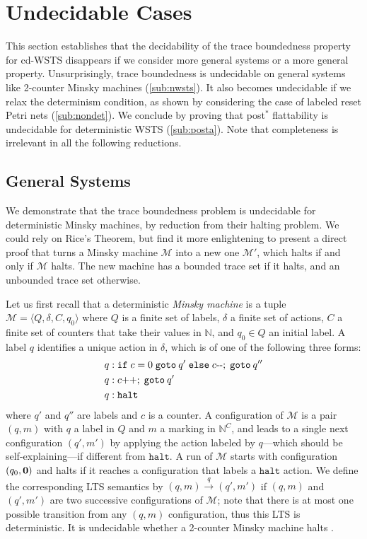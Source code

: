 \documentclass[11pt,reqno,a4paper]{amsart}
\def\vec#1{\mathchoice{\mbox{\boldmath$\displaystyle#1$}}
{\mbox{\boldmath$\textstyle#1$}}
{\mbox{\boldmath$\scriptstyle#1$}}
{\mbox{\boldmath$\scriptscriptstyle#1$}}}
\newcommand{\tup}[1]{\langle #1\rangle}
\newcommand{\ru}[1]{\xrightarrow{#1}}
\theoremstyle{plain}
\theoremstyle{definition}
\theoremstyle{remark}
\begin{document}
\section{Undecidable Cases}\label{sec:undec}
This section establishes that the decidability of the trace
boundedness property for cd-WSTS disappears if we consider more
general systems or a more general property.  Unsurprisingly, trace
boundedness is undecidable on general systems like 2-counter Minsky
machines (\autoref{sub:nwsts}).  It also becomes undecidable if we
relax the determinism condition, as shown by considering the case of
labeled reset Petri nets (\autoref{sub:nondet}).  We conclude by
proving that post$^\ast$ flattability is undecidable for deterministic
WSTS (\autoref{sub:posta}).  Note that completeness is irrelevant in
all the following reductions.

\subsection{General Systems}\label{sub:nwsts}
We demonstrate that the trace boundedness problem is
undecidable for deterministic Minsky machines, by reduction
from their halting problem.  We could rely on Rice's Theorem, but find
it more enlightening to present a direct proof that turns a Minsky
machine $\mathcal{M}$ into a new one $\mathcal{M}'$, which halts if
and only if $\mathcal{M}$ halts.  The new machine has a bounded trace
set if it halts, and an unbounded trace set otherwise.

Let us first recall that a deterministic \emph{Minsky machine} is a
tuple $\mathcal{M}=\tup{Q,\delta,C,q_0}$ where $Q$ is a finite set of
labels, $\delta$ a finite set of actions, $C$ a
finite set of counters that take their values in $\mathbb{N}$, and
$q_0\in Q$ an initial label.  A label $q$ identifies a unique action
in $\delta$, which is of one of the following three forms:
\begin{align*}
    q:&\;\mathtt{if}\;c=0\;\mathtt{goto}\:q'\;\mathtt{else}\;c\text-\text-;\;\mathtt{goto}\:q''\\
    q:&\;c\text{++};\;\mathtt{goto}\:q'\\
    q:&\;\mathtt{halt}
\end{align*}
where $q'$ and $q''$ are labels and $c$ is a counter.  A configuration
of $\mathcal{M}$ is a pair $(q,m)$ with $q$ a label in $Q$ and
$m$ a marking in $\mathbb{N}^C$, and leads to a single next configuration
$(q',m')$ by applying the action labeled by $q$---which should be
self-explaining---if different from $\mathtt{halt}$.  A run of
$\mathcal{M}$ starts with configuration $(q_0,\vec{0})$ and halts if
it reaches a configuration that labels a $\mathtt{halt}$ action.  We
define the corresponding LTS semantics by $(q,m)\ru{q}(q',m')$ if
$(q,m)$ and $(q',m')$ are two successive configurations of
$\mathcal{M}$; note that there is at most one possible transition from
any $(q,m)$ configuration, thus this LTS is deterministic.  It is
undecidable whether a 2-counter Minsky machine halts \citep{minsky}.
\end{document}
